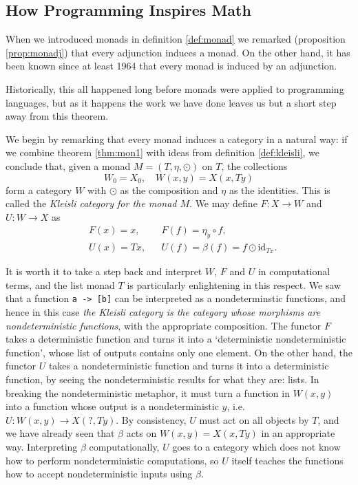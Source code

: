 \documentclass[11pt]{article}
\theoremstyle{nonumberplain}
\newcommand{\id}{\mathrm{id}}
\newcommand*\lsin{\lstinline}
\begin{document}
\subsection{How Programming Inspires Math}

When we introduced monads in definition \ref{def:monad} we remarked (proposition \ref{prop:monadj}) that every adjunction induces a monad. On the other hand, it has been known since at least 1964 \cite{kleisli} that every monad is induced by an adjunction.

Historically, this all happened long before monads were applied to programming languages, but as it happens the work we have done leaves us but a short step away from this theorem.

We begin by remarking that every monad induces a category in a natural way: if we combine theorem \ref{thm:mon1} with ideas from definition \ref{def:kleisli}, we conclude that, given a monad $M = (T,\eta,\odot)$ on $T$, the collections
\begin{equation}
W_0 = X_0, \quad W(x,y) = X(x,Ty)
\end{equation}
form a category $W$ with $\odot$ as the composition and $\eta$ as the identities. This is called the \emph{Kleisli category for the monad $M$}. We may define $F \colon X \to W$ and $U \colon W \to X$ as
\begin{equation}\label{eq:fudef}
\begin{aligned}
&F(x) = x, && F(f) = \eta_y \circ f,\\
&U(x) = Tx, && U(f) = \beta(f) = f \odot \id_{Tx}.
\end{aligned}
\end{equation}

It is worth it to take a step back and interpret $W$, $F$ and $U$ in computational terms, and the list monad $T$ is particularly enlightening in this respect. We saw that a function \lsin|a -> [b]| can be interpreted as a nondeterminstic functions, and hence in this case \emph{the Kleisli category is the category whose morphisms are nondeterministic functions}, with the appropriate composition. The functor $F$ takes a deterministic function and turns it into a `deterministic nondeterministic function', whose list of outputs contains only one element. On the other hand, the functor $U$ takes a nondeterministic function and turns it into a deterministic function, by seeing the nondeterministic results for what they are: lists. In breaking the nondeterministic metaphor, it must turn a function in $W(x,y)$ into a function whose output is a nondeterministic $y$, i.e. $U \colon W(x,y) \to X(?, Ty)$. By consistency, $U$ must act on all objects by $T$, and we have already seen that $\beta$ acts on $W(x,y) = X(x,Ty)$ in an appropriate way. Interpreting $\beta$ computationally, $U$ goes to a category which does not know how to perform nondeterministic computations, so $U$ itself teaches the functions how to accept nondeterministic inputs using $\beta$.
\end{document}

